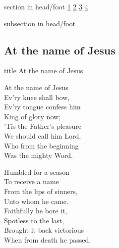 \documentclass{beamer}
\begin{document}
{
{ 
 {
 \begin{beamercolorbox}[ht=4.5ex,dp=1.5ex,%
      leftskip=.3cm,rightskip=.3cm plus1fil]{section in head/foot}
 \fontsize{12}{25}\selectfont 
\hyperlink{At the name of Jesus[]1}{1}
\hyperlink{At the name of Jesus[]2}{2}
\hyperlink{At the name of Jesus[]3}{3}
\hyperlink{At the name of Jesus[]4}{4}
 
 \end{beamercolorbox}%
  \begin{beamercolorbox}[ht=2.5ex,dp=1.125ex,%
   leftskip=.3cm,rightskip=.3cm plus1fil]{subsection in head/foot}
   \insertauthor
 \end{beamercolorbox}%
 }
}
\subsection{ At the name of Jesus }

\hypertarget{At the name of Jesus[]}{}
\begin{frame}{}
 \vfill
  \centering
  \begin{beamercolorbox}[sep=8pt,center,shadow=true,rounded=true]{title}
    At the name of Jesus    
  \end{beamercolorbox}
  \vfill
\end{frame}

\hypertarget{At the name of Jesus[]1}{}
\begin{frame}{}
\fontsize{ 18 }{ 23 }\selectfont

At the name of Jesus\\ 
Ev'ry knee shall bow,\\ 
Ev'ry tongue confess him\\ 
King of glory now;\\ 
'Tis the Father's pleasure\\ 
We should call him Lord,\\ 
Who from the beginning\\ 
Was the mighty Word. 

\end{frame}

\hypertarget{At the name of Jesus[]2}{}
\begin{frame}{}
\fontsize{ 18 }{ 23 }\selectfont

Humbled for a season\\ 
To receive a name\\ 
From the lips of sinners,\\ 
Unto whom he came.\\ 
Faithfully he bore it,\\ 
Spotless to the last,\\ 
Brought it back victorious\\ 
When from death he passed. 


\end{frame}}
\end{document}
